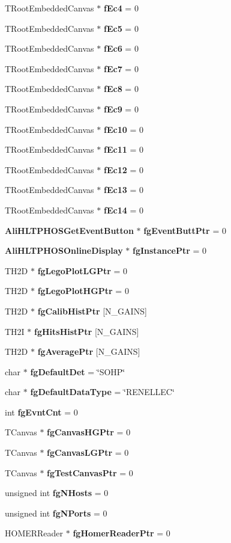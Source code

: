 \begin{CompactItemize}
\item 
TRoot\-Embedded\-Canvas $\ast$ {\bf f\-Ec4} = 0
\item 
TRoot\-Embedded\-Canvas $\ast$ {\bf f\-Ec5} = 0
\item 
TRoot\-Embedded\-Canvas $\ast$ {\bf f\-Ec6} = 0
\item 
TRoot\-Embedded\-Canvas $\ast$ {\bf f\-Ec7} = 0
\item 
TRoot\-Embedded\-Canvas $\ast$ {\bf f\-Ec8} = 0
\item 
TRoot\-Embedded\-Canvas $\ast$ {\bf f\-Ec9} = 0
\item 
TRoot\-Embedded\-Canvas $\ast$ {\bf f\-Ec10} = 0
\item 
TRoot\-Embedded\-Canvas $\ast$ {\bf f\-Ec11} = 0
\item 
TRoot\-Embedded\-Canvas $\ast$ {\bf f\-Ec12} = 0
\item 
TRoot\-Embedded\-Canvas $\ast$ {\bf f\-Ec13} = 0
\item 
TRoot\-Embedded\-Canvas $\ast$ {\bf f\-Ec14} = 0
\item 
{\bf Ali\-HLTPHOSGet\-Event\-Button} $\ast$ {\bf fg\-Event\-Butt\-Ptr} = 0
\item 
{\bf Ali\-HLTPHOSOnline\-Display} $\ast$ {\bf fg\-Instance\-Ptr} = 0
\item 
TH2D $\ast$ {\bf fg\-Lego\-Plot\-LGPtr} = 0
\item 
TH2D $\ast$ {\bf fg\-Lego\-Plot\-HGPtr} = 0
\item 
TH2D $\ast$ {\bf fg\-Calib\-Hist\-Ptr} [N\_\-GAINS]
\item 
TH2I $\ast$ {\bf fg\-Hits\-Hist\-Ptr} [N\_\-GAINS]
\item 
TH2D $\ast$ {\bf fg\-Average\-Ptr} [N\_\-GAINS]
\item 
char $\ast$ {\bf fg\-Default\-Det} = \char`\"{}SOHP\char`\"{}
\item 
char $\ast$ {\bf fg\-Default\-Data\-Type} = \char`\"{}RENELLEC\char`\"{}
\item 
int {\bf fg\-Evnt\-Cnt} = 0
\item 
TCanvas $\ast$ {\bf fg\-Canvas\-HGPtr} = 0
\item 
TCanvas $\ast$ {\bf fg\-Canvas\-LGPtr} = 0
\item 
TCanvas $\ast$ {\bf fg\-Test\-Canvas\-Ptr} = 0
\item 
unsigned int {\bf fg\-NHosts} = 0
\item 
unsigned int {\bf fg\-NPorts} = 0
\item 
HOMERReader $\ast$ {\bf fg\-Homer\-Reader\-Ptr} = 0

\end{CompactItemize}
